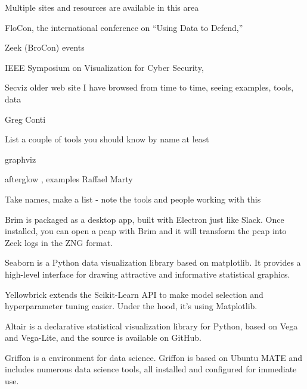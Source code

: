 \documentclass[Screen16to9,17pt]{foils}
\begin{document}


\begin{quote}

\end{quote}

\begin{list2}
  \item Multiple sites and resources are available in this area
  \item FloCon, the international conference on “Using Data to Defend,” 
  \item Zeek (BroCon) events 
  \item IEEE Symposium on Visualization for Cyber Security, 
  \item Secviz older web site I have browsed from time to time, seeing examples, tools, data
  \item Greg Conti 
\item List a couple of tools you should know by name at least
\item graphviz 
\item afterglow , examples Raffael Marty
\end{list2}

\centerline{Take names, make a list - note the tools and people working with this}




\begin{list2}
  \item {} Brim is packaged as a desktop app, built with Electron just like Slack. Once installed, you can open a pcap with Brim and it will transform the pcap into Zeek logs in the ZNG format.
  \item {} Seaborn is a Python data visualization library based on matplotlib. It provides a high-level interface for drawing attractive and informative statistical graphics.
  \item {}  Yellowbrick extends the Scikit-Learn API to make model selection and hyperparameter tuning easier. Under the hood, it’s using Matplotlib.
  \item {} Altair is a declarative statistical visualization library for Python, based on Vega and Vega-Lite, and the source is available on GitHub.
  \item {} Griffon is a environment for data science. Griffon is based on Ubuntu MATE and includes numerous data science tools, all installed and configured for immediate use.
\end{list2}
\end{document}
